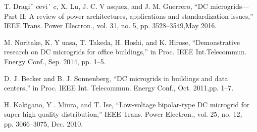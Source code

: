 \documentclass[journal]{IEEEtran}
\begin{document}


%
%
%
\begin{thebibliography}{1}

T. Dragiˇ cevi´ c, X. Lu, J. C. V asquez, and J. M. Guerrero, “DC microgrids—
Part II: A review of power architectures, applications and standardization issues,” IEEE Trans. Power Electron., vol. 31, no. 5, pp. 3528–3549,May 2016.

M. Noritake, K. Y uasa, T. Takeda, H. Hoshi, and K. Hirose, “Demonstrative research on DC microgrids for office buildings,” in Proc. IEEE Int.Telecommun. Energy Conf., Sep. 2014, pp. 1–5.

D. J. Becker and B. J. Sonnenberg, “DC microgrids in buildings and data centers,” in Proc. IEEE Int. Telecommun. Energy Conf., Oct. 2011,pp. 1–7.

H. Kakigano, Y . Miura, and T. Ise, “Low-voltage bipolar-type DC microgrid for super high quality distribution,” IEEE Trans. Power Electron., vol. 25, no. 12, pp. 3066–3075, Dec. 2010.


\end{thebibliography}



% 
\end{document}
